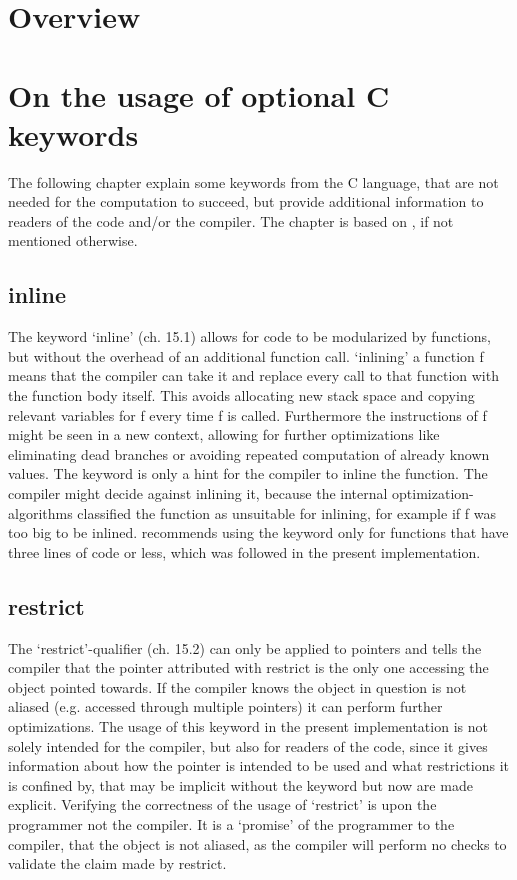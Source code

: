 \hypertarget{overview}{%
\section{Overview}\label{overview}}

\hypertarget{on-the-usage-of-optional-c-keywords}{%
\section{On the usage of optional C
keywords}\label{on-the-usage-of-optional-c-keywords}}

The following chapter explain some keywords from the C language, that
are not needed for the computation to succeed, but provide additional
information to readers of the code and/or the compiler. The chapter is
based on \cite{modernc}, if not mentioned otherwise.

\hypertarget{inline}{%
\subsection{inline}\label{inline}}

The keyword `inline' (ch. 15.1) allows for code to be modularized by
functions, but without the overhead of an additional function call.
`inlining' a function f means that the compiler can take it and replace
every call to that function with the function body itself. This avoids
allocating new stack space and copying relevant variables for f
every time f is called. Furthermore the instructions of f might be seen in
a new context, allowing for further optimizations like eliminating dead
branches or avoiding repeated computation of already known values. The
keyword is only a hint for the compiler to inline the function. The
compiler might decide against inlining it, because the internal
optimization-algorithms classified the function as unsuitable for
inlining, for example if f was too big to be inlined. \cite[ch. 16]{styleguide} recommends using the keyword only for functions that have
three lines of code or less, which was followed in the present
implementation.

\hypertarget{restrict}{%
\subsection{restrict}\label{restrict}}

The `restrict'-qualifier (ch. 15.2) can only be applied to pointers and
tells the compiler that the pointer attributed with restrict is the only
one accessing the object pointed towards. If the compiler knows the
object in question is not aliased (e.g. accessed through multiple
pointers) it can perform further optimizations. The usage of this
keyword in the present implementation is not solely intended for the
compiler, but also for readers of the code, since it gives information
about how the pointer is intended to be used and what restrictions it is
confined by, that may be implicit without the keyword but now are made
explicit. Verifying the correctness of the usage of `restrict' is upon
the programmer not the compiler. It is a `promise' of the programmer to
the compiler, that the object is not aliased, as the compiler will
perform no checks to validate the claim made by restrict.

